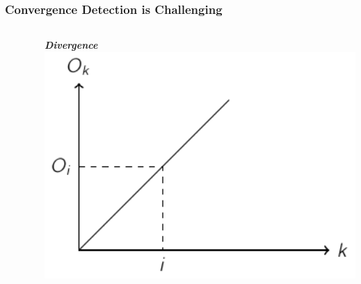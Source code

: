 \documentclass[aspectratio=169]{beamer}
\begin{document}
\begin{frame}
  \frametitle{Convergence Detection is Challenging}
  \begin{block}{}%
    \begin{columns}
      \begin{column}{0.49\textwidth}
        \begin{center}
          \resizebox{1\textwidth}{!}{
            
            }
        \end{center}
      \end{column}
      \begin{column}{0.49\textwidth}
        \begin{center}{\scriptsize  \textbf{\textit{Divergence}}}
          \includegraphics[width=1\textwidth]{figures/diverge}
        \end{center}
      \end{column}
    \end{columns}
  \end{block}
\end{frame}
\end{document}
